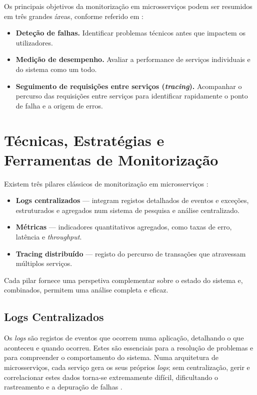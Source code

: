 Os principais objetivos da monitorização em microsserviços podem ser resumidos em três grandes áreas, conforme referido em \cite{Richardson2018}:

\begin{itemize}
    \item \textbf{Deteção de falhas.} Identificar problemas técnicos antes que impactem os utilizadores.
    
    \item \textbf{Medição de desempenho.} Avaliar a performance de serviços individuais e do sistema como um todo.
    
    \item \textbf{Seguimento de requisições entre serviços (\textit{tracing}).} Acompanhar o percurso das requisições entre serviços para identificar rapidamente o ponto de falha e a origem de erros.
\end{itemize}


\section{Técnicas, Estratégias e Ferramentas de Monitorização}

Existem três pilares clássicos de monitorização em microsserviços \cite{Soldani2018}:

\begin{itemize}
    \item \textbf{Logs centralizados} — integram registos detalhados de eventos e exceções, estruturados e agregados num sistema de pesquisa e análise centralizado.
    \item \textbf{Métricas} — indicadores quantitativos agregados, como taxas de erro, latência e \textit{throughput}.
    \item \textbf{Tracing distribuído} — registo do percurso de transações que atravessam múltiplos serviços.
\end{itemize}

Cada pilar fornece uma perspetiva complementar sobre o estado do sistema e, combinados, permitem uma análise completa e eficaz.

\subsection{Logs Centralizados}

Os \textit{logs} são registos de eventos que ocorrem numa aplicação, detalhando o que aconteceu e quando ocorreu. Estes são essenciais para a resolução de problemas e para compreender o comportamento do sistema. Numa arquitetura de microsserviços, cada serviço gera os seus próprios \textit{logs}; sem centralização, gerir e correlacionar estes dados torna-se extremamente difícil, dificultando o rastreamento e a depuração de falhas \cite{Soldani2022}.

